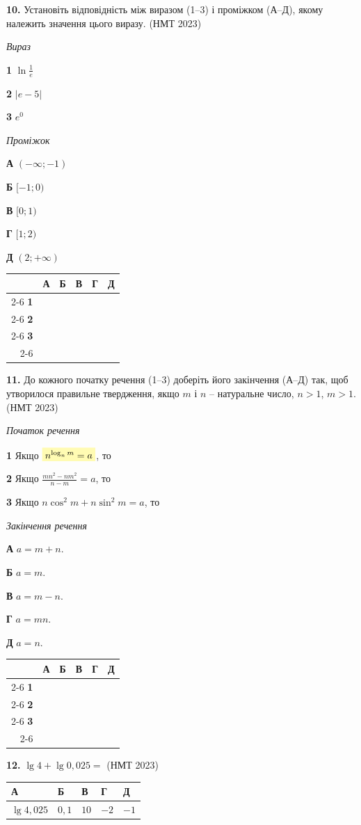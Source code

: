 \documentclass[14pt]{extarticle}
\newcommand{\answerGrid}{
    \begingroup
    \renewcommand{\arraystretch}{1.3} 
    \setlength{\tabcolsep}{7pt} 
    \begin{tabular}{r|c|c|c|c|c|}
         \multicolumn{1}{c}{} & \multicolumn{1}{c}{\textbf{А}} & \multicolumn{1}{c}{\textbf{Б}} & \multicolumn{1}{c}{\textbf{В}} & \multicolumn{1}{c}{\textbf{Г}} & \multicolumn{1}{c}{\textbf{Д}} \\ \cline{2-6}
         \textbf{1} & & & & & \\ \cline{2-6}
         \textbf{2} & & & & & \\ \cline{2-6}
         \textbf{3} & & & & & \\ \cline{2-6}
    \end{tabular}
    \endgroup
}
\newcommand{\matchingLayout}[3]{
    \noindent
    \begin{minipage}[t]{0.40\textwidth}
        #1
    \end{minipage}%
    \hfill
    \begin{minipage}[t]{0.28\textwidth}
        #2
    \end{minipage}%
    \hfill
    \begin{minipage}[t]{0.30\textwidth}
        \vspace{0pt}
        \begin{flushright}
        #3
        \end{flushright}
    \end{minipage}
}
\newcommand{\answerTable}[5]{
\begin{center}
\begin{tabular}{|*{5}{>{\centering\arraybackslash}m{2.8cm}|}}
\hline
\rule[-0.3cm]{0pt}{0.8cm}\textbf{А} & \textbf{Б} & \textbf{В} & \textbf{Г} & \textbf{Д} \\
\hline
\rule[-0.4cm]{0pt}{1.0cm}#1 & \rule[-0.4cm]{0pt}{1.0cm}#2 & \rule[-0.4cm]{0pt}{1.0cm}#3 & \rule[-0.4cm]{0pt}{1.0cm}#4 & \rule[-0.4cm]{0pt}{1.0cm}#5 \\
\hline
\end{tabular}
\end{center}
}
\newcommand{\nmtyear}[1]{\hfill{\small\color{yearcolor}(НМТ #1)}}
\begin{document}
\vspace{0.8cm}

\noindent\textbf{10.} Установіть відповідність між виразом (1--3) і проміжком (А--Д), якому належить значення цього виразу. \nmtyear{2023}
\vspace{0.3cm}

\matchingLayout{
\textit{Вираз}

\textbf{1} \quad $\ln \displaystyle\frac{1}{e}$

\textbf{2} \quad $|e - 5|$

\textbf{3} \quad $e^0$
}{
\textit{Проміжок}

\textbf{А} \quad $(-\infty; -1)$

\textbf{Б} \quad $[-1; 0)$

\textbf{В} \quad $[0; 1)$

\textbf{Г} \quad $[1; 2)$

\textbf{Д} \quad $(2; +\infty)$
}{
\answerGrid
}

\vspace{0.8cm}

\noindent\textbf{11.} До кожного початку речення (1--3) доберіть його закінчення (А--Д) так, щоб утворилося правильне твердження, якщо $m$ і $n$ -- натуральне число, $n > 1$, $m > 1$. \nmtyear{2023}
\vspace{0.3cm}

\matchingLayout{
\textit{Початок речення}

\textbf{1} \quad Якщо $\colorbox{yellow!30}{$n^{\log_n m} = a$}$, то

\textbf{2} \quad Якщо $\displaystyle\frac{mn^2 - nm^2}{n - m} = a$, то

\textbf{3} \quad Якщо $n\cos^2 m + n\sin^2 m = a$, то
}{
\textit{Закінчення речення}

\textbf{А} \quad $a = m + n$.

\textbf{Б} \quad $a = m$.

\textbf{В} \quad $a = m - n$.

\textbf{Г} \quad $a = mn$.

\textbf{Д} \quad $a = n$.
}{
\answerGrid
}

\vspace{0.8cm}

\noindent\textbf{12.} $\lg 4 + \lg 0{,}025 = $ \nmtyear{2023}
\vspace{0.3cm}

\answerTable{$\lg 4{,}025$}{$0{,}1$}{$10$}{$-2$}{$-1$}
\end{document}
